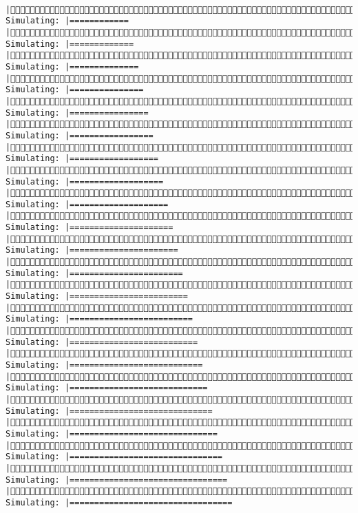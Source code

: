 \documentclass[]{article}
\begin{document}
\begin{verbatim}
     |(4/4) Simulating: |============                                           |(4/4) Simulating: |=============                                          |(4/4) Simulating: |==============                                         |(4/4) Simulating: |===============                                        |(4/4) Simulating: |================                                       |(4/4) Simulating: |=================                                      |(4/4) Simulating: |==================                                     |(4/4) Simulating: |===================                                    |(4/4) Simulating: |====================                                   |(4/4) Simulating: |=====================                                  |(4/4) Simulating: |======================                                 |(4/4) Simulating: |=======================                                |(4/4) Simulating: |========================                               |(4/4) Simulating: |=========================                              |(4/4) Simulating: |==========================                             |(4/4) Simulating: |===========================                            |(4/4) Simulating: |============================                           |(4/4) Simulating: |=============================                          |(4/4) Simulating: |==============================                         |(4/4) Simulating: |===============================                        |(4/4) Simulating: |================================                       |(4/4) Simulating: |=================================                      
\end{verbatim}
\end{document}
